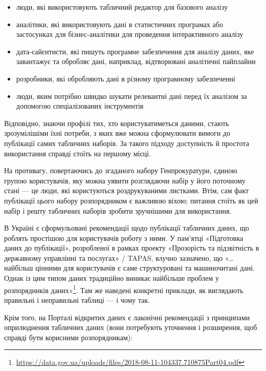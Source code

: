 \documentclass[
]{agujournal2019}
\providecommand{\tightlist}{%
  \setlength{\itemsep}{0pt}\setlength{\parskip}{0pt}}\usepackage{longtable,booktabs,array}
\begin{document}
\begin{itemize}
\tightlist
\item
  люди, які використовують табличний редактор для базового аналізу
\item
  аналітики, які використовують дані в статистичних програмах або
  застосунках для бізнес-аналітики для проведення інтерактивного аналізу
\item
  дата-сайєнтисти, які пишуть програмне забезпечення для аналізу даних,
  яке завантажує та обробляє дані, наприклад, відтворювані аналітичні
  пайплайни
\item
  розробники, які обробляють дані в різному програмному забезпеченні
\item
  люди, яким потрібно швидко шукати релевантні дані перед їх аналізом за
  допомогою спеціалізованих інструментів
\end{itemize}

Відповідно, знаючи профілі тих, хто користуватиметься даними, стають
зрозумілішіми їхні потреби, з яких вже можна сформулювати вимоги до
публікації самих табличних наборів. За такого підходу доступність й
простота використання справді стоїть на першому місці.

На противагу, повертаючись до згаданого набору Генпрокуратури, єдиною
групою користувачів, яку можна уявити розглядаючи набір у його поточному
стані --- це люди, які користуються роздрукуваними листками. Втім, сам
факт публікації цього набору розпорядником є важливою віхою; питання
стоїть як цей набір і решту табличних наборів зробити зручнішими для
використання.

В Україні є сформульовані рекомендації щодо публікації табличних даних,
що роблять простішою для користувачів роботу з ними. У пам'ятці
«Підготовка даних до публікації», розробленої в рамках проекту
«Прозорість та підзвітність в державному управлінні та послугах» /
TAPAS, влучно зазначено, що «\ldots{} найбільш цінними для користувачів
є саме структуровані та машиночитані дані. Однак із цим типом даних
традиційно виникає найбільше проблем у розпорядників даних»\footnote{\url{https://data.gov.ua/uploads/files/2018-08-11-104337.710875Part04.pdf}}.
Там же наведені конкретні приклади, як виглядають правильні і
неправильні таблиці --- і чому так.

Крім того, на Порталі відкритих даних є лаконічні рекомендації з
принципами оприлюднення табличних даних (вони потребують уточнення і
розширення, щоб справді бути корисними розпорядникам):
\end{document}
